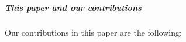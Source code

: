 \subparagraph*{This paper and our contributions}



Our contributions in this paper are the following:
